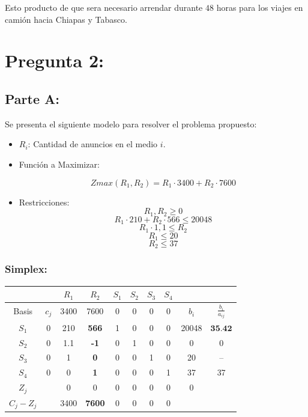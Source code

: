 \documentclass[]{article}
\begin{document}
Esto producto de que sera necesario arrendar durante $48$ horas para los viajes en camión hacia Chiapas y Tabasco.



\section{Pregunta 2:}

\subsection{Parte A:}

Se presenta el siguiente modelo para resolver el problema propuesto:

\begin{itemize}
    
\item $R_i$: Cantidad de anuncios en el medio $i$.

\item Función a Maximizar:

$$Zmax(R_1,R_2)=R_1\cdot 3400 + R_2\cdot 7600$$

\item Restricciones:
$$R_1 , R_2 \geq 0$$
$$R_1\cdot 210 + R_2\cdot 566 \leq 20048$$
$$R_1\cdot1,1 \leq R_2$$
$$R_1 \leq 20$$
$$R_2 \leq 37$$
\end{itemize}

\subsubsection{Simplex:}

\begin{table}[!htb]
    \centering
    \begin{tabular}{c|c|c|c|c|c|c|c|c|c} %
         & & $R_1$ & $R_2$ & $S_1$ & $S_2$ & $S_3$ & $S_4$ & & \\ \hline
        Basis & $c_j$ & 3400 & 7600 & 0 & 0 & 0 & 0 & $b_i$ & $\frac{b_i}{a_{ij}}$\\ \hline
        $S_1$ & 0 & 210 & \textbf{566} & 1 & 0 & 0 & 0 & 20048 & $\textbf{35.42}$\\ \hline
        $S_2$ & 0 & 1.1 & \textbf{-1} & 0 & 1 & 0 & 0 & 0 & 0\\ \hline
        $S_3$ & 0 & 1 & \textbf{0} & 0 & 0 & 1 & 0 & 20 & --\\ \hline
        $S_4$ & 0 & 0 & \textbf{1} & 0 & 0 & 0 & 1 & 37 & 37\\ \hline
        $Z_j$ & & 0 & 0 & 0 & 0 & 0 & 0 & 0 & \\
        $C_j-Z_j$ & & 3400 & \textbf{7600} & 0 & 0 & 0 & 0 & & \\
    \end{tabular}
\end{table}
\end{document}
